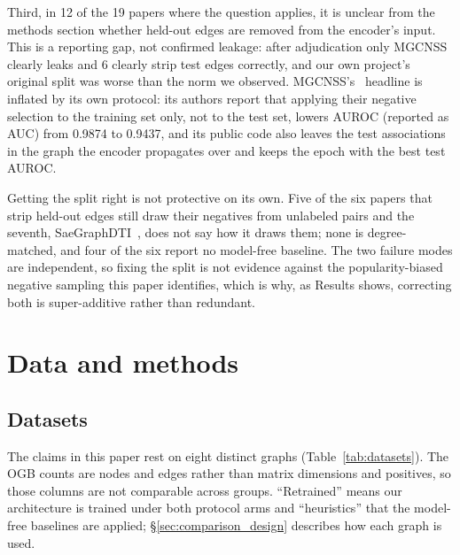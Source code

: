 \documentclass[review]{elsarticle}
\begin{document}
Third, in 12 of the 19 papers where the question applies, it is unclear from the methods
section whether held-out edges are removed from the encoder's input. This is a reporting
gap, not confirmed leakage: after adjudication only MGCNSS~\cite{tian2024mgcnss} clearly leaks and 6 clearly strip
test edges correctly, and our own project's original split was worse than the norm we
observed. MGCNSS's~\cite{tian2024mgcnss} headline is inflated by its own protocol: its authors
report that applying their negative selection to the training set only, not to the test set,
lowers AUROC (reported as AUC) from 0.9874 to 0.9437, and its public code also leaves the
test associations in the graph the encoder propagates over and keeps the epoch with the best
test AUROC.

Getting the split right is not protective on its own. Five of the six papers that strip held-out
edges still draw their negatives from unlabeled pairs and the seventh, SaeGraphDTI~\cite{zhang2025saegraphdti},
does not say how it draws them; none is degree-matched, and four
of the six report no model-free baseline. The two failure modes are independent, so fixing
the split is not evidence against the popularity-biased negative sampling this paper
identifies, which is why, as Results shows, correcting both is super-additive rather than
redundant.



\section{Data and methods}
\label{sec:methods}

\subsection{Datasets}
\label{sec:data}
The claims in this paper rest on eight distinct graphs (Table~\ref{tab:datasets}).
The OGB counts are nodes and edges rather than matrix dimensions and positives, so those
columns are not comparable across groups. ``Retrained'' means our architecture is trained
under both protocol arms and ``heuristics'' that the model-free baselines are applied;
\S\ref{sec:comparison_design} describes how each graph is used.
\end{document}
